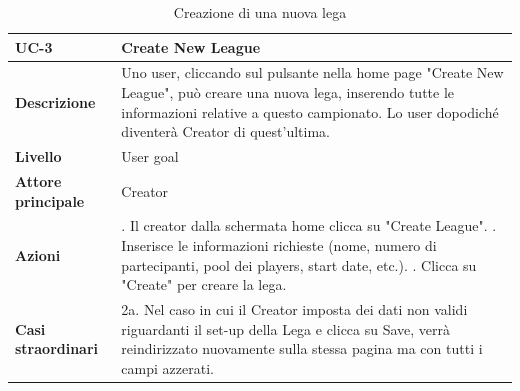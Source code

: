 \documentclass[twoside,openright,titlepage,fleqn,headinclude,12pt,a4paper,BCOR=5mm,footinclude]{scrbook}
\begin{document}
\begin{table}[H]
    \centering
    \begin{tabular}{|>{\raggedright\arraybackslash}m{2.5cm}|>{\raggedright\arraybackslash}m{10cm}|}
        \hline
        \textbf{UC-3} & \textbf{Create New League} \\
        \hline
        \textbf{Descrizione} & Uno user, cliccando sul pulsante nella home page "Create New League", può creare una nuova lega, inserendo tutte le informazioni relative a questo campionato. Lo user dopodiché diventerà Creator di quest'ultima. \\
        \hline
        \textbf{Livello} & User goal \\
        \hline
        \textbf{Attore principale} & Creator \\
        \hline
        \textbf{Azioni} & 
        1. Il creator dalla schermata home clicca su "Create League". \newline
        2. Inserisce le informazioni richieste (nome, numero di partecipanti, pool dei players, start date, etc.). \newline
        3. Clicca su "Create" per creare la lega. \\
        \hline
        \textbf{Casi straordinari} & 2a. Nel caso in cui il Creator imposta dei dati non validi riguardanti il set-up della Lega e clicca su Save, verrà reindirizzato nuovamente sulla stessa pagina ma con tutti i campi azzerati. \\
        \hline
    \end{tabular}
    \caption{Creazione di una nuova lega}
    \label{tab:create_new_league}
\end{table}
\end{document}
